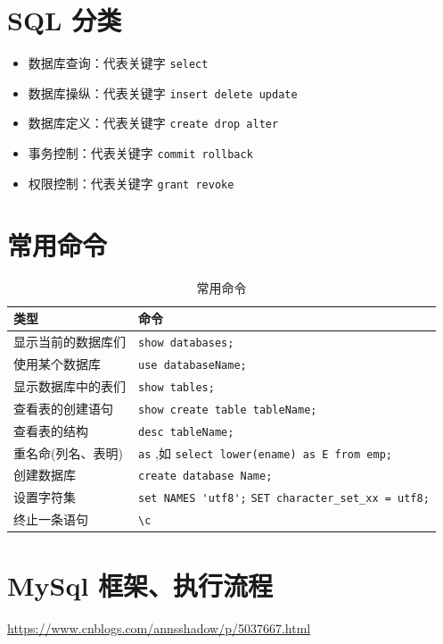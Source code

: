\documentclass[UTF8,a4paper,12pt]{ctexbook}
\begin{document}
	\section{SQL 分类}
		\begin{itemize}
			\item 数据库查询：代表关键字 \verb|select|
			\item 数据库操纵：代表关键字 \verb|insert delete update|
			\item 数据库定义：代表关键字 \verb|create drop alter|
			\item 事务控制：代表关键字 \verb|commit rollback|
			\item 权限控制：代表关键字 \verb|grant revoke|
		\end{itemize} 
	
	\section{常用命令}
		\begin{table}[H]
			\centering
			\caption{常用命令}
			\begin{tabular}{p{4cm}<{\centering}|p{11cm}<{\centering}}
				\hline
					类型  & 命令 \\
				\hline
					显示当前的数据库们  & \verb|show databases;| \\
					使用某个数据库	& 	\verb|use databaseName;| \\
					显示数据库中的表们	& \verb|show tables;|	\\
					查看表的创建语句	& \verb|show create table tableName;|	\\
					查看表的结构	& \verb|desc tableName;|	\\
					重名命(列名、表明)	& \verb|as| ,如 \verb|select lower(ename) as E from emp;|	\\
					创建数据库	& \verb|create database Name;|	\\
					设置字符集	& \verb|set NAMES 'utf8';| \verb|SET character_set_xx = utf8;|	\\
					终止一条语句	& \verb|\c|	\\
				\hline
			\end{tabular}
		\end{table}

	\section{MySql 框架、执行流程}
		\url{https://www.cnblogs.com/annsshadow/p/5037667.html}
		
\end{document}
